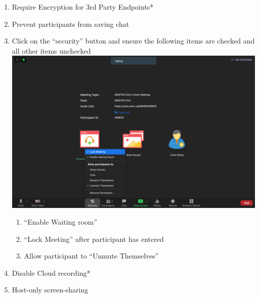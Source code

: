 \documentclass[]{book}
\providecommand{\tightlist}{%
  \setlength{\itemsep}{0pt}\setlength{\parskip}{0pt}}
\begin{document}
\begin{enumerate}
\def\labelenumi{\arabic{enumi}.}
\tightlist
\item
  Require Encryption for 3rd Party Endpoints*
\item
  Prevent participants from saving chat
\item
  Click on the ``security'' button and ensure the following items are checked and all other items unchecked \includegraphics{images/zoom_security/1.png}

  \begin{enumerate}
  \def\labelenumii{\alph{enumii}.}
  \tightlist
  \item
    ``Enable Waiting room''
  \item
    ``Lock Meeting'' after participant has entered
  \item
    Allow participant to ``Unmute Themselves''
  \end{enumerate}
\item
  Disable Cloud recording*
\item
  Host-only screen-sharing


\end{enumerate}
\end{document}
